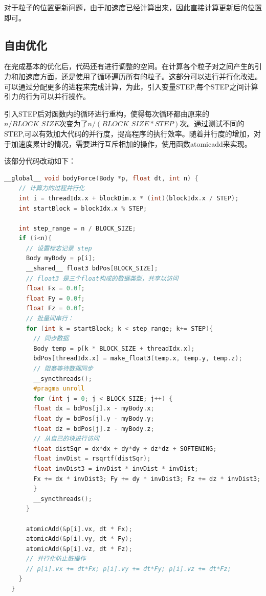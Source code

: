 \documentclass[a4paper,11pt,UTF8]{ctexart}
\begin{document}
对于粒子的位置更新问题，由于加速度已经计算出来，因此直接计算更新后的位置即可。

\subsection{自由优化}

在完成基本的优化后，代码还有进行调整的空间。在计算各个粒子对之间产生的引力和加速度方面，还是使用了循环遍历所有的粒子。这部分可以进行并行化改进。可以通过分配更多的进程来完成计算，为此，引入变量STEP,每个STEP之间计算引力的行为可以并行操作。

引入STEP后对函数内的循环进行重构，使得每次循环都由原来的$n/BLOCK\_SIZE$次变为了$n/(BLOCK\_SIZE*STEP)$次。通过测试不同的STEP,可以有效加大代码的并行度，提高程序的执行效率。随着并行度的增加，对于加速度累计的情况，需要进行互斥相加的操作，使用函数atomicadd来实现。

该部分代码改动如下：
\begin{lstlisting}[language=C++]
  __global__ void bodyForce(Body *p, float dt, int n) {
    // 计算力的过程并行化
    int i = threadIdx.x + blockDim.x * (int)(blockIdx.x / STEP);
    int startBlock = blockIdx.x % STEP;
    
    int step_range = n / BLOCK_SIZE;
    if (i<n){
      // 设置标志记录 step
      Body myBody = p[i];
      __shared__ float3 bdPos[BLOCK_SIZE];
      // float3 是三个float构成的数据类型，共享以访问
      float Fx = 0.0f;
      float Fy = 0.0f;
      float Fz = 0.0f;
      // 批量间串行：
      for (int k = startBlock; k < step_range; k+= STEP){
        // 同步数据
        Body temp = p[k * BLOCK_SIZE + threadIdx.x];
        bdPos[threadIdx.x] = make_float3(temp.x, temp.y, temp.z);
        // 阻塞等待数据同步
        __syncthreads();
        #pragma unroll
        for (int j = 0; j < BLOCK_SIZE; j++) {
        float dx = bdPos[j].x - myBody.x;
        float dy = bdPos[j].y - myBody.y;
        float dz = bdPos[j].z - myBody.z;
        // 从自己的块进行访问
        float distSqr = dx*dx + dy*dy + dz*dz + SOFTENING;
        float invDist = rsqrtf(distSqr);
        float invDist3 = invDist * invDist * invDist;
        Fx += dx * invDist3; Fy += dy * invDist3; Fz += dz * invDist3;
        }     
        __syncthreads();
      }

      atomicAdd(&p[i].vx, dt * Fx);
      atomicAdd(&p[i].vy, dt * Fy);
      atomicAdd(&p[i].vz, dt * Fz);
      // 并行化防止脏操作
      // p[i].vx += dt*Fx; p[i].vy += dt*Fy; p[i].vz += dt*Fz;
    }
  }
\end{lstlisting}
\end{document}
